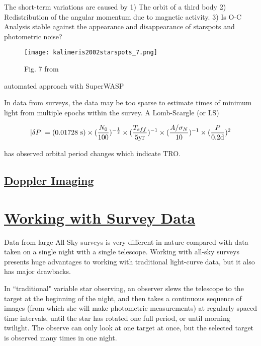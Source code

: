 \documentclass[12pt]{article} %
\numberwithin{equation}{section} %
\begin{document}
The short-term variations are caused by
1) The orbit of a third body
2) Redistribution of the angular momentum due to magnetic activity.
3) 
Is O-C Analysis stable against the appearance and disappearance of starspots and photometric noise? \citep{kalimeris2002starspots}

\begin{figure}[H]
\centering
\texttt{[image: kalimeris2002starspots\_7.png]}
\caption{ Fig. 7 from \citet{kalimeris2002starspots}}
\label{fig: kalimeris2002starspots_7}
\end{figure}

automated approach with SuperWASP \citep{lohr2015orbital}

In data from surveys, the data may be too sparse to estimate times of minimum light from multiple epochs within the survey. A Lomb-Scargle (or LS) \citep{scargle1982studies}

\citep{horne1986prescription} 

\begin{equation} \label{eqn: horne_baliunas}
|\delta P| = (0.01728\text{ s}) \times (\frac{N_{0}}{100})^{-\frac{1}{2}} \times (\frac{T_{eff}}{5\text{yr}})^{-1} \\  \times (\frac{A/ \sigma_{N}}{10})^{-1} \times (\frac{P}{0.2\text{d}})^{2}
\end{equation}


\citet{qian2001orbital} has observed orbital period changes which indicate TRO. 

\subsection[Doppler Imaging]{\hyperlink{toc}{Doppler Imaging}} \label{sec: doppler_imaging}

\section[Working with Survey Data]{\hyperlink{toc}{Working with Survey Data}} \label{sec: Working with Survey Data}

Data from large All-Sky surveys is very different in nature compared with data taken on a single night with a single telescope. Working with all-sky surveys presents huge advantages to working with traditional light-curve data, but it also has major drawbacks.

In ``traditional" variable star observing, an observer slews the telescope to the target at the beginning of the night, and then takes a continuous sequence of images (from which she will make photometric measurements) at regularly spaced time intervals, until the star has rotated one full period, or until morning twilight. The observe can only look at one target at once, but the selected target is observed many times in one night.
\end{document}

